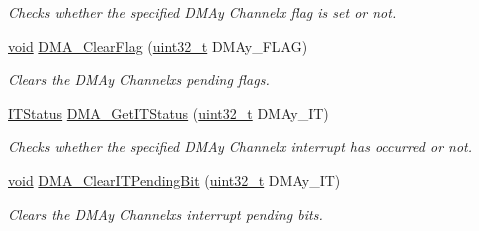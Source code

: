 \begin{DoxyCompactItemize}
\begin{DoxyCompactList}\small\item\em Checks whether the specified D\+M\+Ay Channelx flag is set or not. \end{DoxyCompactList}\item 
\hyperlink{usb__devapi_8h_afabf60e7f57651d6d595a02c75f07cd0}{void} \hyperlink{group___d_m_a___private___functions_ga25cdca360f309c8ceb7c206cd9ad9119}{D\+M\+A\+\_\+\+Clear\+Flag} (\hyperlink{_p_e___types_8h_a33594304e786b158f3fb30289278f5af}{uint32\+\_\+t} D\+M\+Ay\+\_\+\+F\+L\+AG)
\begin{DoxyCompactList}\small\item\em Clears the D\+M\+Ay Channelx\textquotesingle{}s pending flags. \end{DoxyCompactList}\item 
\hyperlink{agilefox_2library_2inc_2stm32f10x__type_8h_aacbd7ed539db0aacd973a0f6eca34074}{I\+T\+Status} \hyperlink{group___d_m_a___private___functions_ga9287331247150fe84d03ecd7ad8adb52}{D\+M\+A\+\_\+\+Get\+I\+T\+Status} (\hyperlink{_p_e___types_8h_a33594304e786b158f3fb30289278f5af}{uint32\+\_\+t} D\+M\+Ay\+\_\+\+IT)
\begin{DoxyCompactList}\small\item\em Checks whether the specified D\+M\+Ay Channelx interrupt has occurred or not. \end{DoxyCompactList}\item 
\hyperlink{usb__devapi_8h_afabf60e7f57651d6d595a02c75f07cd0}{void} \hyperlink{group___d_m_a___private___functions_ga91a7340e5b334a942f3eb1e05ed5f67a}{D\+M\+A\+\_\+\+Clear\+I\+T\+Pending\+Bit} (\hyperlink{_p_e___types_8h_a33594304e786b158f3fb30289278f5af}{uint32\+\_\+t} D\+M\+Ay\+\_\+\+IT)
\begin{DoxyCompactList}\small\item\em Clears the D\+M\+Ay Channelx\textquotesingle{}s interrupt pending bits. \end{DoxyCompactList}\end{DoxyCompactItemize}
